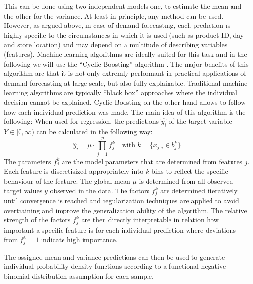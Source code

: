 \documentclass[BCOR=1mm, DIV=calc,10pt,
twoside=true,
twocolumn,
headings=normal]{scrartcl}
\begin{document}
This can be done using two independent models one,  to estimate the mean and the other
for the variance. At least in principle, any method can be used. However, as argued above,
in case of demand forecasting, each prediction is highly specific to the circumstances
in which it is used (such as product ID, day and store location) and may
depend on  a multitude of describing variables (features).
Machine learning algorithms are ideally suited for this task and in the
following we will use the ``Cyclic Boosting'' algorithm \cite{Wick2019}.
The major benefits of this algorithm are that it is not only extremly performant in practical 
applications of demand forecasting at large scale, but also fully explainable. Traditional machine
learning algorithms are typically ``black box'' approaches where the individual decision cannot be 
explained. Cyclic Boosting on the other hand allows to follow how each individual prediction was made.
The main idea of this algorithm is the following: When used for regression,
the predictions $\hat{y_i}$ of the  target variable $Y \in [0,\infty)$ can be calculated in the following
way:
\begin{equation} \label{eqn:cb}
\hat{y}_i = \mu \cdot \prod \limits_{j=1}^p f^k_j \quad \text{with}\; k=\{ x_{j,i} \in b^k_j\}
\end{equation}
The parameters $f^k_j$ are the model parameters that are determined from 
features $j$. Each feature is discretisized appropriately into $k$ bins to reflect the 
specific behaviour of the feature. The global mean $\mu$ is determined from all observed
target values $y$ observed in the data. The factors  $f^k_j$ are determined
iteratively until convergence is reached and regularization techniques are applied
to avoid overtraining and improve the generalization ability of the algorithm.
The relative strength of the factors  $f^k_j$ are then directly interpretable in
relation how important a specific feature is for each individual prediction where deviations
from  $f^k_j=1$ indicate high importance.



The assigned mean and variance predictions can then be used to generate individual
probability density functions according to a functional negative binomial distribution
assumption for each sample.
\end{document}
